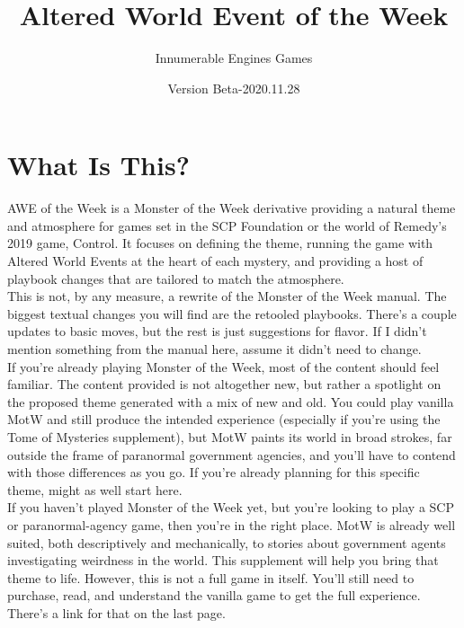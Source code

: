 \documentclass[12pt,oneside,landscape]{memoir}
\begin{document}
\title{Altered World Event of the Week}
\author{Innumerable Engines Games}
\date{Version Beta-2020.11.28}
\maketitle
\pagebreak

\chapter*{What Is This?}
\begin{multicols}{2}
AWE of the Week is a Monster of the Week derivative providing a natural theme and atmosphere for games set in the SCP Foundation or the world of Remedy’s 2019 game, Control.  It focuses on defining the theme, running the game with Altered World Events at the heart of each mystery, and providing a host of playbook changes that are tailored to match the atmosphere.
\\[4mm]
This is not, by any measure, a rewrite of the Monster of the Week manual.  The biggest textual changes you will find are the retooled playbooks.  There’s a couple updates to basic moves, but the rest is just suggestions for flavor.  If I didn’t mention something from the manual here, assume it didn’t need to change.
\\[4mm]
If you’re already playing Monster of the Week, most of the content should feel familiar.  The content provided is not altogether new, but rather a spotlight on the proposed theme generated with a mix of new and old.  You could play vanilla MotW and still produce the intended experience (especially if you’re using the Tome of Mysteries supplement), but MotW paints its world in broad strokes, far outside the frame of paranormal government agencies, and you’ll have to contend with those differences as you go.  If you’re already planning for this specific theme, might as well start here.
\\[4mm]
If you haven’t played Monster of the Week yet, but you’re looking to play a SCP or paranormal-agency game, then you’re in the right place.  MotW is already well suited, both descriptively and mechanically, to stories about government agents investigating weirdness in the world. This supplement will help you bring that theme to life.  However, this is not a full game in itself.  You’ll still need to purchase, read, and understand the vanilla game to get the full experience.  There’s a link for that on the last page.


\end{multicols}
\end{document}
